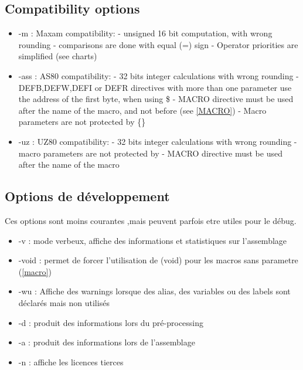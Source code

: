 \begin{xen}
\subsection{Compatibility options}
\begin{itemize}

\item -m : Maxam compatibility:
\subitem - unsigned 16 bit computation, with wrong rounding
\subitem - comparisons are done with equal (=) sign
\subitem - Operator priorities are simplified (see charts)

\item -ass : AS80 compatibility:
\subitem - 32 bits integer calculations with wrong rounding
\subitem - DEFB,DEFW,DEFI or DEFR directives with more than one parameter use the address of the first byte, when using \$ %
\subitem - MACRO directive must be used after the name of the macro, and not before (see \ref{MACRO})
\subitem - Macro parameters are not protected by \{\}

\item -uz : UZ80 compatibility:
\subitem - 32 bits integer calculations with wrong rounding
\subitem - macro parameters are not protected by {}
\subitem - MACRO directive must be used after the name of the macro
\end{itemize}

\end{xen}


\begin{xfr}
\subsection{Options de développement}
Ces options sont moins courantes ,mais peuvent parfois etre utiles pour le débug.
\begin{itemize}
\item -v : mode verbeux, affiche des informations et statistiques sur l'assemblage
\item -void : permet de forcer l'utilisation de (void) pour les macros sans parametre (\ref{macro})
\item -wu : Affiche des warnings lorsque des alias, des variables ou des labels sont déclarés mais non utilisés
\item -d : produit des informations lors du pré-processing
\item -a : produit des informations lors de l'assemblage
\item -n : affiche les licences tierces
\end{itemize}

\end{xfr}

